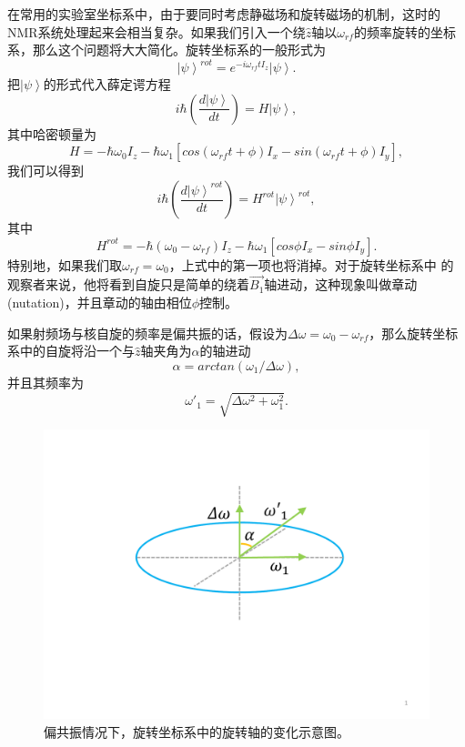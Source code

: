 在常用的实验室坐标系中，由于要同时考虑静磁场和旋转磁场的机制，这时的NMR系统处理起来会相当复杂。如果我们引入一个绕$\hat{z}$轴以$\omega_{rf}$的频率旋转的坐标系，那么这个问题将大大简化。旋转坐标系的一般形式为
\begin{equation}\label{aaa}
\left\vert  \psi \right\rangle^{rot} =e^{-i\omega_{rf}tI_z}\left\vert  \psi \right\rangle.
\end{equation}
把$\left\vert  \psi \right\rangle$的形式代入薛定谔方程
\begin{equation}\label{aaa}
i\hbar(\frac{d\left\vert  \psi \right\rangle}{dt})=H\left\vert  \psi \right\rangle,
\end{equation}
其中哈密顿量为
\begin{equation}\label{aaa}
H = -\hbar \omega_0 I_z -\hbar\omega_1 [cos(\omega_{rf}t+\phi)I_x-sin(\omega_{rf}t+\phi)I_y],
\end{equation}
我们可以得到
\begin{equation}\label{aaa}
i\hbar(\frac{d\left\vert  \psi \right\rangle^{rot}}{dt})=H^{rot}\left\vert  \psi \right\rangle^{rot},
\end{equation}
其中
\begin{equation}\label{aaa}
H^{rot} = -\hbar (\omega_0-\omega_{rf}) I_z -\hbar\omega_1 [cos\phi I_x-sin\phi I_y].
\end{equation}
特别地，如果我们取$\omega_{rf}=\omega_0$，上式中的第一项也将消掉。对于旋转坐标系中
的观察者来说，他将看到自旋只是简单的绕着$\overrightarrow{B_1}$轴进动，这种现象叫做章动(nutation)，并且章动的轴由相位$\phi$控制。

如果射频场与核自旋的频率是偏共振的话，假设为$\Delta\omega = \omega_0-\omega_{rf}$，那么旋转坐标系中的自旋将沿一个与$\hat{z}$轴夹角为$\alpha$的轴进动
 \begin{equation}\label{aaa}
\alpha = arctan(\omega_1/\Delta\omega),
\end{equation}
并且其频率为
\begin{equation}\label{aaa}
\omega'_1 = \sqrt{\Delta\omega^2+\omega_1^2}.
\end{equation}

\begin{figure}[htbp]
            \begin{center}
              \includegraphics[width= 0.8\columnwidth]{figures/rotate.pdf}
              \caption{偏共振情况下，旋转坐标系中的旋转轴的变化示意图。
              }
              \label{rotate}
            \end{center}
\end{figure}

